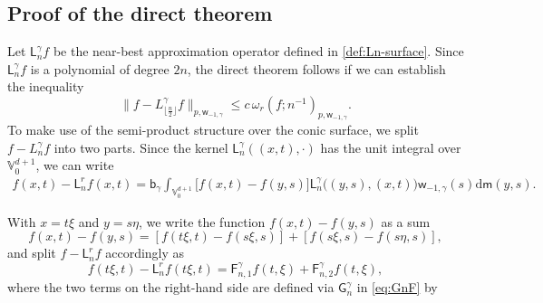 \documentclass{amsart}
\newtheorem{lem}[thm]{Lemma}
\theoremstyle{remark}
\def\d{\mathrm{d}}
\def\g{{\gamma}}
\def\o{{\omega}}
\def\VV{{\mathbb V}}
\def\d{\mathrm{d}}
\def\sF{{\mathsf F}}
\def\sG{{\mathsf G}}
\def\sL{{\mathsf L}}
\def\sb{{\mathsf b}}
\def\sm{{\mathsf m}}
\def\sw{{\mathsf w}}
\def\g{{\gamma}}
\def\o{{\omega}}
\def\VV{{\mathbb V}}
\def\f{\frac}
\def\f{\frac}
\begin{document}
\subsection{Proof of the direct theorem}
Let $\sL_n^\g f$ be the near-best approximation operator defined in \eqref{def:Ln-surface}. Since $\sL_n^\g f$ 
is a polynomial of degree $2n$, the direct theorem follows if we can establish the inequality 
$$
     \| f - L_{\lfloor \f n 2 \rfloor}^\g f\|_{p,\sw_{-1,\g}} \le c\, \o_r(f;  n^{-1})_{p,\sw_{-1,\g}}.
$$
To make use of the semi-product structure over the conic surface, we split $f - L_n^\g f$ into two parts. 
Since the kernel $\sL_n^\g((x,t),\cdot)$ has the unit integral over $\VV_0^{d+1}$, we can write 
\begin{align*}
 f(x,t) -  \sL_n^rf(x,t) =  \sb_\g \int_{\VV_0^{d+1}} \big[ f(x,t) -f(y,s)\big] \sL_n^\g \big((y,s),(x,t)\big) \sw_{-1,\g}(s)  \d \sm(y,s).
\end{align*}

With $x = t \xi$ and $y = s \eta$, we write the function $f(x,t) - f(y,s)$ as a sum  
$$
 f(x,t) -f(y,s) = \left[f(t\xi,t) -f(s \xi, s) \right]+ \left[ f(s \xi,s) -f(s \eta, s)\right], 
$$
and split $ f -  \sL_n^rf$ accordingly as 
\begin{equation}\label{eq:F1+F2}
   f(t\xi, t) -  \sL_n^rf(t\xi, t) = \sF_{n,1}^\g f (t,\xi) + \sF_{n,2}^\g f (t,\xi), 
\end{equation}
where the two terms on the right-hand side are defined via $\sG_n^\g$ in \eqref{eq:GnF} by
\end{document}
